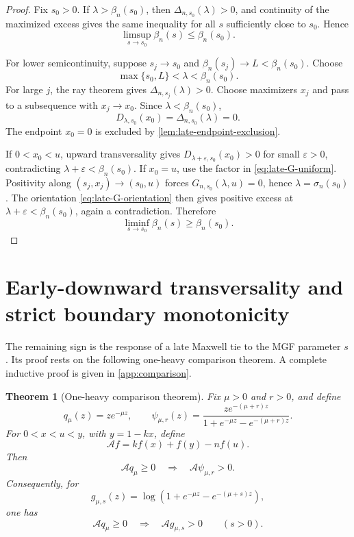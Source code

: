 \documentclass[11pt]{article}
\theoremstyle{plain}
\newtheorem{theorem}{Theorem}[section]
\theoremstyle{definition}
\theoremstyle{remark}
\newcommand{\cA}{\mathcal A}
\begin{document}
\begin{proof}
Fix \(s_0>0\).  If \(\lambda>\beta_n(s_0)\), then \(\Delta_{n,s_0}(\lambda)>0\), and continuity of the maximized excess gives the same inequality for all \(s\) sufficiently close to \(s_0\).  Hence
\[
\limsup_{s\to s_0}\beta_n(s)\le\beta_n(s_0).
\]

For lower semicontinuity, suppose \(s_j\to s_0\) and \(\beta_n(s_j)\to L<\beta_n(s_0)\).  Choose
\[
\max\{s_0,L\}<\lambda<\beta_n(s_0).
\]
For large \(j\), the ray theorem gives \(\Delta_{n,s_j}(\lambda)>0\).  Choose maximizers \(x_j\) and pass to a subsequence with \(x_j\to x_0\).  Since \(\lambda<\beta_n(s_0)\),
\[
D_{\lambda,s_0}(x_0)=\Delta_{n,s_0}(\lambda)=0.
\]
The endpoint \(x_0=0\) is excluded by \cref{lem:late-endpoint-exclusion}.

If \(0<x_0<u\), upward transversality gives \(D_{\lambda+\varepsilon,s_0}(x_0)>0\) for small \(\varepsilon>0\), contradicting \(\lambda+\varepsilon<\beta_n(s_0)\).  If \(x_0=u\), use the factor in \eqref{eq:late-G-uniform}.  Positivity along \((s_j,x_j)\to(s_0,u)\) forces \(G_{n,s_0}(\lambda,u)=0\), hence \(\lambda=\sigma_n(s_0)\).  The orientation \eqref{eq:late-G-orientation} then gives positive excess at \(\lambda+\varepsilon<\beta_n(s_0)\), again a contradiction.  Therefore
\[
\liminf_{s\to s_0}\beta_n(s)\ge\beta_n(s_0).
\]
\end{proof}

\section{Early-downward transversality and strict boundary monotonicity}

The remaining sign is the response of a late Maxwell tie to the MGF parameter \(s\).  Its proof rests on the following one-heavy comparison theorem.  A complete inductive proof is given in \cref{app:comparison}.

\begin{theorem}[One-heavy comparison theorem]\label{thm:comparison-main}
Fix \(\mu>0\) and \(r>0\), and define
\[
q_\mu(z)=ze^{-\mu z},
\qquad
\psi_{\mu,r}(z)
=\frac{ze^{-(\mu+r)z}}
{1+e^{-\mu z}-e^{-(\mu+r)z}}.
\]
For \(0<x<u<y\), with \(y=1-kx\), define
\[
\cA f=kf(x)+f(y)-nf(u).
\]
Then
\begin{equation}\label{eq:comparison-main}
\cA q_\mu\ge0
\quad\Longrightarrow\quad
\cA\psi_{\mu,r}>0.
\end{equation}
Consequently, for
\[
g_{\mu,s}(z)=\log\left(1+e^{-\mu z}-e^{-(\mu+s)z}\right),
\]
one has
\begin{equation}\label{eq:comparison-integrated}
\cA q_\mu\ge0
\quad\Longrightarrow\quad
\cA g_{\mu,s}>0
\qquad(s>0).
\end{equation}
\end{theorem}
\end{document}
